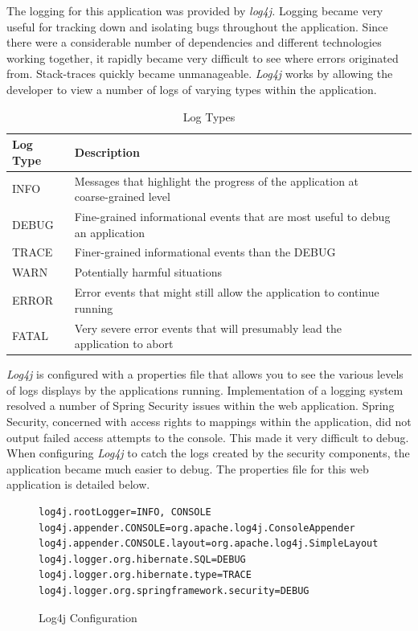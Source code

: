 The logging for this application was provided by \textit{log4j.} Logging became very useful for tracking down and isolating bugs throughout the application. Since there were a considerable number of dependencies and different technologies working together, it rapidly became very difficult to see where errors originated from. Stack-traces quickly became unmanageable. \textit{Log4j} works by allowing the developer to view a number of logs of varying types within the application.
\begin{table}[H]
\caption{Log Types}
\begin{center}
    \begin{tabular}{ | l | l | p{5cm} |}
    \hline
    Log Type & Description \\ \hline
    INFO & Messages that highlight the progress of the application at coarse-grained level  \\ \hline
    DEBUG & Fine-grained informational events that are most useful to debug an application\\ \hline
	TRACE & Finer-grained informational events than the DEBUG\\ \hline
	WARN & Potentially harmful situations\\ \hline
	ERROR & Error events that might still allow the application to continue running\\ \hline
    FATAL & Very severe error events that will presumably lead the application to abort\\ \hline
    \end{tabular}
\end{center}

\end{table}

\textit{Log4j} is configured with a properties file that allows you to see the various levels of logs displays by the applications running. Implementation of a logging system resolved a number of Spring Security issues within the web application. Spring Security, concerned with access rights to mappings within the application, did not output failed access attempts to the console. This made it very difficult to debug. When configuring \textit{Log4j} to catch the logs created by the security components, the application became much easier to debug. The properties file for this web application is detailed below.

\begin{figure}[H]
\begin{lstlisting}
log4j.rootLogger=INFO, CONSOLE
log4j.appender.CONSOLE=org.apache.log4j.ConsoleAppender
log4j.appender.CONSOLE.layout=org.apache.log4j.SimpleLayout
log4j.logger.org.hibernate.SQL=DEBUG
log4j.logger.org.hibernate.type=TRACE
log4j.logger.org.springframework.security=DEBUG
\end{lstlisting}
\caption{Log4j Configuration}
\end{figure}

